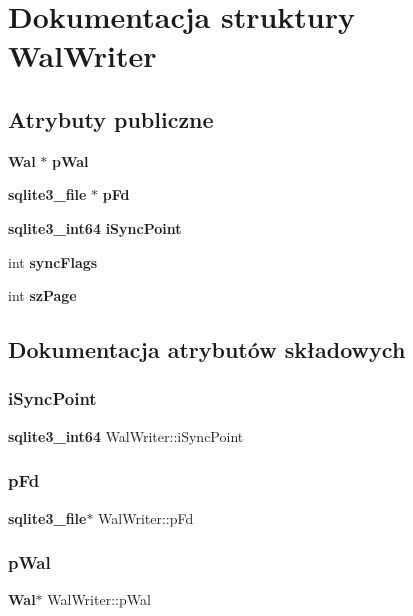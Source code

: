 \section{Dokumentacja struktury Wal\+Writer}
\label{struct_wal_writer}
\subsection*{Atrybuty publiczne}
\begin{DoxyCompactItemize}
\item 
\textbf{ Wal} $\ast$ \textbf{ p\+Wal}
\item 
\textbf{ sqlite3\+\_\+file} $\ast$ \textbf{ p\+Fd}
\item 
\textbf{ sqlite3\+\_\+int64} \textbf{ i\+Sync\+Point}
\item 
int \textbf{ sync\+Flags}
\item 
int \textbf{ sz\+Page}
\end{DoxyCompactItemize}


\subsection{Dokumentacja atrybutów składowych}
\mbox{\label{struct_wal_writer_a1227aea1e12b6b409e8a7cdbae43588e}} 
\subsubsection{iSyncPoint}
{\footnotesize\ttfamily \textbf{ sqlite3\+\_\+int64} Wal\+Writer\+::i\+Sync\+Point}

\mbox{\label{struct_wal_writer_a0c98cddd084b97d9f531fa71b92ef40a}} 
\subsubsection{pFd}
{\footnotesize\ttfamily \textbf{ sqlite3\+\_\+file}$\ast$ Wal\+Writer\+::p\+Fd}

\mbox{\label{struct_wal_writer_a3ed1cabab4a2f0572ec04d2a174e5bf9}} 
\subsubsection{pWal}
{\footnotesize\ttfamily \textbf{ Wal}$\ast$ Wal\+Writer\+::p\+Wal}

